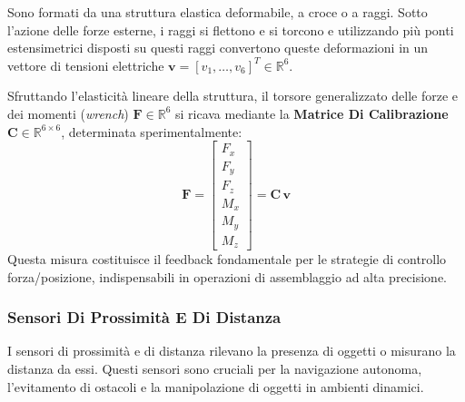 ﻿\documentclass[11pt, a4paper]{article}
\begin{document}
Sono formati da una struttura elastica deformabile, a croce o a raggi. Sotto l'azione delle forze esterne, i raggi si flettono e si torcono e utilizzando più ponti estensimetrici disposti su questi raggi convertono queste deformazioni in un vettore di tensioni elettriche $\boldsymbol{v} = [v_1, \dots, v_6]^T \in \mathbb{R}^6$.

Sfruttando l'elasticità lineare della struttura, il torsore generalizzato delle forze e dei momenti (\textit{wrench}) $\boldsymbol{F} \in \mathbb{R}^6$ si ricava mediante la \textbf{Matrice Di Calibrazione} $\boldsymbol{C} \in \mathbb{R}^{6 \times 6}$, determinata sperimentalmente:
\[
    \boldsymbol{F} = \begin{bmatrix} F_x \\ F_y \\ F_z \\ M_x \\ M_y \\ M_z \end{bmatrix} = \boldsymbol{C} \, \boldsymbol{v}
\]
Questa misura costituisce il feedback fondamentale per le strategie di controllo forza/posizione, indispensabili in operazioni di assemblaggio ad alta precisione.

\subsubsection{Sensori Di Prossimità E Di Distanza}
I sensori di prossimità e di distanza rilevano la presenza di oggetti o misurano la distanza da essi. Questi sensori sono cruciali per la navigazione autonoma, l'evitamento di ostacoli e la manipolazione di oggetti in ambienti dinamici.
\end{document}
